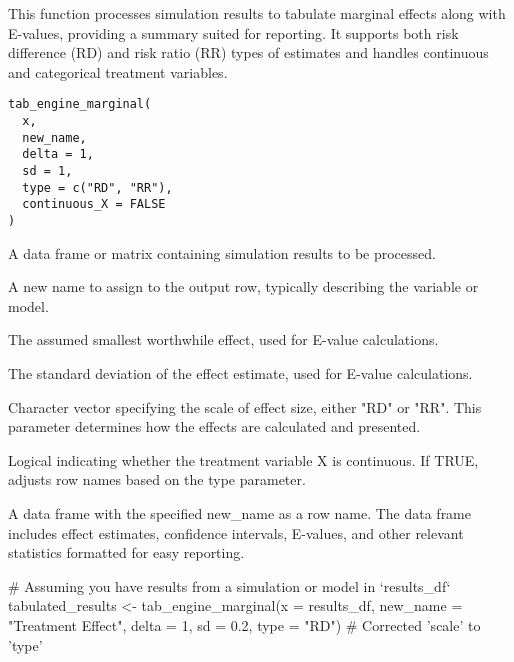 \documentclass[a4paper]{book}
\begin{document}
%
\begin{Description}
This function processes simulation results to tabulate marginal effects along with E-values,
providing a summary suited for reporting. It supports both risk difference (RD) and risk ratio (RR)
types of estimates and handles continuous and categorical treatment variables.
\end{Description}
%
\begin{Usage}
\begin{verbatim}
tab_engine_marginal(
  x,
  new_name,
  delta = 1,
  sd = 1,
  type = c("RD", "RR"),
  continuous_X = FALSE
)
\end{verbatim}
\end{Usage}
%
\begin{Arguments}
\begin{ldescription}
\item[\code{x}] A data frame or matrix containing simulation results to be processed.

\item[\code{new\_name}] A new name to assign to the output row, typically describing the variable or model.

\item[\code{delta}] The assumed smallest worthwhile effect, used for E-value calculations.

\item[\code{sd}] The standard deviation of the effect estimate, used for E-value calculations.

\item[\code{type}] Character vector specifying the scale of effect size, either "RD" or "RR".
This parameter determines how the effects are calculated and presented.

\item[\code{continuous\_X}] Logical indicating whether the treatment variable X is continuous.
If TRUE, adjusts row names based on the type parameter.
\end{ldescription}
\end{Arguments}
%
\begin{Value}
A data frame with the specified new\_name as a row name. The data frame includes
effect estimates, confidence intervals, E-values, and other relevant statistics formatted
for easy reporting.
\end{Value}
%
\begin{Examples}
\begin{ExampleCode}
# Assuming you have results from a simulation or model in `results_df`
tabulated_results <- tab_engine_marginal(x = results_df,
                                         new_name = "Treatment Effect",
                                         delta = 1,
                                         sd = 0.2,
                                         type = "RD")  # Corrected 'scale' to 'type'

\end{ExampleCode}
\end{Examples}
\end{document}
